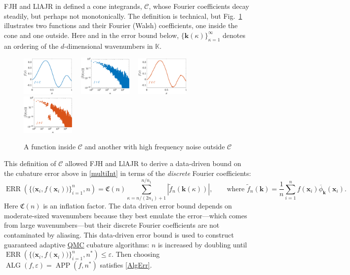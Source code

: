 \documentclass[11pt]{NSFamsart}
\newcommand{\QMC}{\hyperlink{QMClink}{QMC}\xspace}
\newcommand{\tf}{\widetilde{f}}
\newcommand{\bbK}{\mathbb{K}}
\DeclareMathOperator{\APP}{APP}
\DeclareMathOperator{\ALG}{ALG}
\DeclareMathOperator{\ERR}{ERR}
\newcommand{\bx}{{\boldsymbol{x}}}
\newcommand{\bk}{{\boldsymbol{k}}}
\newcommand{\cc}{\mathcal{C}}
\newcommand{\fC}{\mathfrak{C}}
\def\abs#1{\ensuremath{\left \lvert #1 \right \rvert}}
\newcommand{\dataN}{\bigl\{\bigl(\bx_i,f(\bx_i)\bigr)\bigr\}_{i=1}^n}
\begin{document}
FJH and LlAJR in \cite{HicJim16a,JimHic16a} defined a cone integrands, $\cc$, 
whose Fourier coefficients decay steadily, but perhaps not monotonically.  The definition is technical, but Fig.\ \ref{GoodBadWalshFig} 
illustrates two functions and their Fourier 
(Walsh) coefficients, one inside the cone and one outside.  Here and in the error bound below, $\{\bk(\kappa)\}_{\kappa = 1}^\infty$ 
denotes an ordering of the $d$-dimensional wavenumbers in $\bbK$.

\begin{figure}[h]
	\centering
	\includegraphics[width = 0.23\textwidth] 
	{ProgramsImages/FunctionWalshFourierCoeffDecay.eps} \ \ 
	\includegraphics[width = 0.23\textwidth] 
	{ProgramsImages/WalshFourierCoeffDecay128.eps} \ \ 
	\includegraphics[width = 0.23\textwidth] 
	{ProgramsImages/FilteredFunctionWalshFourierCoeffDecay.eps} \ \ 
	\includegraphics[width = 0.23\textwidth] 
	{ProgramsImages/WalshFourierCoeffDecayFilter.eps}
	\caption{A function inside $\cc$ and another with high frequency noise outside $\cc$
	\label{GoodBadWalshFig}}
\end{figure}

This definition  of $\cc$ allowed FJH and LlAJR to derive a data-driven bound on the cubature error above in \eqref{multiInt} in terms of the \emph{discrete} Fourier coefficients: 
\begin{equation*}
\ERR(\dataN,n) = \fC(n) \sum_{\kappa = n/(2n_1) + 1}^{n/n_1} \abs{\tf_n(\bk(\kappa))}, \qquad \text{where } \tf_n(\bk)  = \frac{1}n \sum_{i=1}^{n} f(\bx_i) \overline{\phi}_{\bk}(\bx_i).
\end{equation*}
Here $\fC(n)$ is an inflation factor.  The data driven error bound depends on moderate-sized wavenumbers because they best emulate the error---which comes from large wavenumbers---but their discrete Fourier coefficients are not contaminated by aliasing. This data-driven error bound is used to construct guaranteed adaptive \QMC cubature 
algorithms: $n$ is increased by doubling until $\ERR(\dataN,n^*) \le \varepsilon$.  Then choosing 
$\ALG(f,\varepsilon) = \APP(f,n^*)$ satisfies 
\eqref{AlgErr}.  
\end{document}
